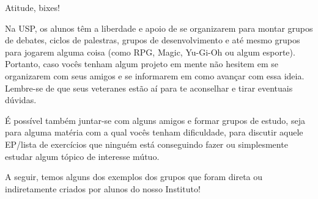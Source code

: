 \begin{secao}{Atitude, bixes!}

Na USP, os alunos têm a liberdade e apoio de se organizarem
para montar grupos de debates, ciclos de palestras, grupos
de desenvolvimento e até mesmo grupos para jogarem alguma coisa (como
RPG, Magic, Yu-Gi-Oh ou algum esporte).
Portanto, caso vocês tenham algum projeto em mente não hesitem
em se organizarem com seus amigos e se informarem em como avançar com essa
ideia. Lembre-se de que seus veteranes estão aí para te aconselhar e tirar
eventuais dúvidas.

É possível também juntar-se com alguns amigos e formar grupos de
estudo, seja para alguma matéria com a qual vocês tenham dificuldade, para
discutir aquele EP/lista de exercícios que ninguém está conseguindo
fazer ou simplesmente estudar algum tópico de interesse mútuo.

A seguir, temos alguns dos exemplos dos grupos que foram direta ou indiretamente
criados por alunos do nosso Instituto!













\pagebreak







\pagebreak




\end{secao}
